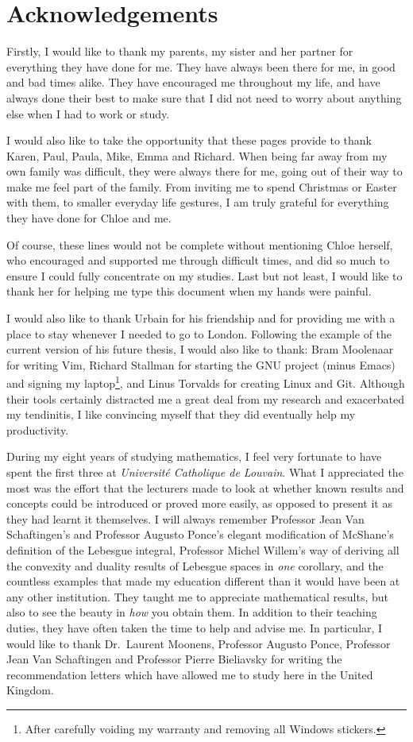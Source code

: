 \chapter*{Acknowledgements}

Firstly, I would like to thank my parents, my sister and her partner for everything they have done for me.
They have always been there for me,
in good and bad times alike.
They have encouraged me throughout my life,
and have always done their best to make sure that I did not need to worry about anything else when I had to work or study.

I would also like to take the opportunity that these pages provide to thank Karen, Paul, Paula, Mike, Emma and Richard.
When being far away from my own family was difficult,
they were always there for me, going out of their way to make me feel part of the family.
From inviting me to spend Christmas or Easter with them,
to smaller everyday life gestures,
I am truly grateful for everything they have done for Chloe and me.

Of course,
these lines would not be complete without mentioning Chloe herself, who encouraged and supported me through difficult times,
and did so much to ensure I could fully concentrate on my studies.
Last but not least,
I would like to thank her for helping me type this document
when my hands were painful.

I would also like to thank Urbain for his friendship and for providing me with a place to stay whenever I needed to go to London.
Following the example of the current version of his future thesis,
I would also like to thank:
Bram Moolenaar for writing Vim,
Richard Stallman for starting the GNU project (minus Emacs) and signing my laptop\footnote{After carefully voiding my warranty and removing all Windows stickers.},
and Linus Torvalds for creating Linux and Git.
Although their tools certainly distracted me a great deal from my research
and exacerbated my tendinitis,
I like convincing myself that they did eventually help my productivity.

During my eight years of studying mathematics,
I feel very fortunate to have spent the first three at \emph{Universit\'e Catholique de Louvain}.
What I appreciated the most was the effort that the lecturers made to look at
whether known results and concepts could be introduced or proved more easily,
as opposed to present it as they had learnt it themselves.
I will always remember Professor Jean Van Schaftingen's and Professor Augusto Ponce's elegant modification of McShane's definition of the Lebesgue integral,
Professor Michel Willem's way of deriving all the convexity and duality results of Lebesgue spaces in \emph{one} corollary,
and the countless examples that made my education different than it would have been at any other institution.
They taught me to appreciate mathematical results,
but also to see the beauty in \emph{how} you obtain them.
In addition to their teaching duties,
they have often taken the time to help and advise me.
In particular,
I would like to thank Dr.\ Laurent Moonens,
Professor Augusto Ponce, Professor Jean Van Schaftingen and Professor Pierre Bieliavsky for writing the recommendation letters which have allowed me to study here in the United Kingdom.

